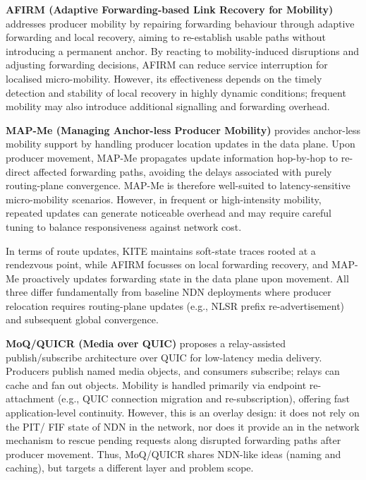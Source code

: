 \documentclass[10pt,conference]{IEEEtran}
\begin{document}
\textbf{AFIRM (Adaptive Forwarding-based Link Recovery for Mobility)} \cite{meddeb:2018:afirm} addresses producer mobility by repairing forwarding behaviour through adaptive forwarding and local recovery, aiming to re-establish usable paths without introducing a permanent anchor. By reacting to mobility-induced disruptions and adjusting forwarding decisions, AFIRM can reduce service interruption for localised micro-mobility. However, its effectiveness depends on the timely detection and stability of local recovery in highly dynamic conditions; frequent mobility may also introduce additional signalling and forwarding overhead.

\textbf{MAP-Me (Managing Anchor-less Producer Mobility)} \cite{auge:2016:map-me, auge:2018:map-me} provides anchor-less mobility support by handling producer location updates in the data plane. Upon producer movement, MAP-Me propagates update information hop-by-hop to re-direct affected forwarding paths, avoiding the delays associated with purely routing-plane convergence. MAP-Me is therefore well-suited to latency-sensitive micro-mobility scenarios. However, in frequent or high-intensity mobility, repeated updates can generate noticeable overhead and may require careful tuning to balance responsiveness against network cost.

In terms of route updates, KITE maintains soft-state traces rooted at a rendezvous point, while AFIRM focusses on local forwarding recovery, and MAP-Me proactively updates forwarding state in the data plane upon movement. All three differ fundamentally from baseline NDN deployments where producer relocation requires routing-plane updates (e.g., NLSR prefix re-advertisement) and subsequent global convergence.

\textbf{MoQ/QUICR (Media over QUIC)} \cite{jennings:2022:quicr-arch} proposes a relay-assisted publish/subscribe architecture over QUIC for low-latency media delivery. Producers publish named media objects, and consumers subscribe; relays can cache and fan out objects. Mobility is handled primarily via endpoint re-attachment (e.g., QUIC connection migration and re-subscription), offering fast application-level continuity. However, this is an overlay design: it does not rely on the PIT/ FIF state of NDN in the network, nor does it provide an in the network mechanism to rescue pending requests along disrupted forwarding paths after producer movement. Thus, MoQ/QUICR shares NDN-like ideas (naming and caching), but targets a different layer and problem scope.
\end{document}
